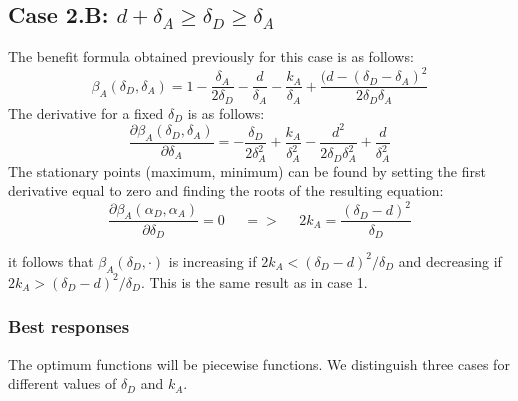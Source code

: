 \subsection*{Case 2.B: $d+\delta_{A} \geq \delta_{D} \geq  \delta_{A} $} 

The benefit formula obtained previously for this case is as follows: 
\begin{equation*}
\beta_{A}(\delta_{D},\delta_{A}) = 1 - \dfrac{\delta_{A}}{2\delta_{D}} - \dfrac{d}{\delta_{A}} - \dfrac{k_{A}}{\delta_{A}} + \dfrac{(d-(\delta_{D}-\delta_{A})^{2}}{2\delta_{D}\delta_{A}} 
\end{equation*}
The derivative for a fixed $\delta_{D}$ is as follows:
\begin{equation*}
\dfrac{\partial \beta_{A}(\delta_{D},\delta_{A})}{\partial \delta_{A}} = -\dfrac{\delta_{D}}{2\delta_{A}^{2}} + \dfrac{k_{A}}{\delta_{A}^{2}} - \dfrac{d^{2}}{2\delta_{D}\delta_{A}^{2}} + \dfrac{d}{\delta_{A}^{2}}
\end{equation*}
The stationary points (maximum, minimum) can be found by setting the first derivative equal to zero and finding the roots of the resulting equation:
\begin{equation*}
\frac{\partial \beta_{A}(\alpha_{D},\alpha_{A})}{\partial \delta_{D}} =0 ~~~~~~ =>~~~~~~ 2k_{A} = \dfrac{(\delta_{D}-d)^{2}}{\delta_{D}}
\end{equation*}

it follows that $\beta_{A}(\delta_{D},\cdot)$ is increasing if $2k_{A} < (\delta_{D} - d)^{2} / \delta_{D}$ and decreasing if $2k_{A} > (\delta_{D} - d)^{2} / \delta_{D}$. This is the same result as in case 1.\\


\subsubsection{Best responses}
The optimum functions will be piecewise functions. We distinguish three cases for different values of $\delta_{D}$ and $k_{A}$. 


